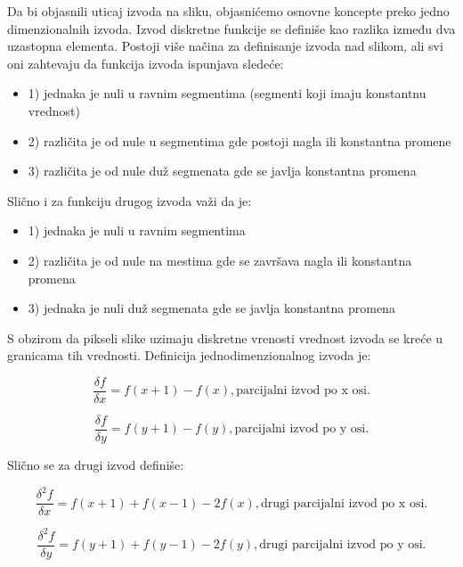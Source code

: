 \documentclass[a4paper,12pt,titlepage]{article}
\begin{document}
Da bi objasnili uticaj izvoda na sliku, objasnićemo osnovne koncepte preko jedno dimenzionalnih izvoda. Izvod diskretne funkcije se definiše kao razlika između dva uzastopna elementa. Postoji više načina za definisanje izvoda nad slikom, ali svi oni zahtevaju da funkcija izvoda ispunjava sledeće:
 
\begin{itemize}
\item 1) jednaka je nuli u ravnim segmentima (segmenti koji imaju konstantnu vrednost) 
\item 2) različita je od nule u segmentima gde postoji nagla ili konstantna promene 
\item 3) različita je od nule duž segmenata gde se javlja konstantna promena
\end{itemize}

Slično i za funkciju drugog izvoda važi da je: 

\begin{itemize}
\item 1) jednaka je nuli u ravnim segmentima 
\item 2) različita je od nule na mestima gde se završava nagla ili konstantna promena 
\item 3) jednaka je nuli duž segmenata gde se javlja konstantna promena 
\end{itemize}

S obzirom da pikseli slike uzimaju diskretne vrenosti vrednost izvoda se kreće u granicama tih vrednosti. Definicija jednodimenzionalnog izvoda je:

\begin{equation}\label{eq:izvod}
\dfrac{\delta f}{\delta x} = f(x + 1) - f(x), \text{parcijalni izvod po x osi}.
\end{equation}

\begin{equation}\label{eq:izvod123}
\dfrac{\delta f}{\delta y} = f(y + 1) - f(y), \text{parcijalni izvod po y osi}.
\end{equation}

Slično se za drugi izvod definiše:

\begin{equation}\label{eq:izvod2}
\dfrac{\delta^2 f}{\delta x} = f(x + 1) + f(x - 1) - 2f(x), \text{drugi parcijalni izvod po x osi}.
\end{equation}

\begin{equation}\label{eq:izvod1234}
\dfrac{\delta^2 f}{\delta y} = f(y + 1) + f(y - 1) - 2f(y), \text{drugi parcijalni izvod po y osi}.
\end{equation}
\end{document}
